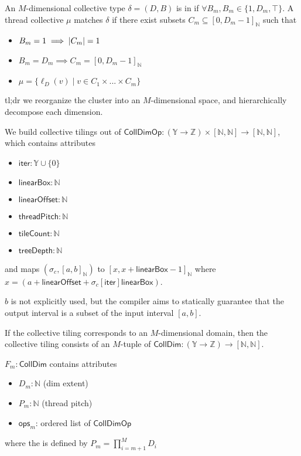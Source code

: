 \filbreak
{}

An $M$-dimensional collective type $\delta = (D, B)$ is in  if $\forall B_m, B_m \in \{1, D_m, \top\}$.
A thread collective $\mu$ matches $\delta$ if there exist subsets $C_m \subseteq [0, D_m - 1]_\mathbb{N}$ such that
\begin{itemize}
  \item $B_m = 1 \implies \left \vert C_m \right\vert = 1$
  \item $B_m = D_m \implies C_m = [0, D_m-1]_\mathbb{N}$
  \item $\mu = \{ \ell_D(v) \mid v \in C_1 \times ... \times C_m \}$
\end{itemize}

\filbreak
{}

tl;dr we reorganize the cluster into an $M$-dimensional space, and hierarchically decompose each dimension.

We build collective tilings out of $\mathsf{CollDimOp}: (\mathbb{Y} \to \mathbb{Z}) \times [\mathbb{N}, \mathbb{N}] \to [\mathbb{N}, \mathbb{N}]$, which contains attributes
\begin{itemize}
  \item $\mathsf{iter}: \mathbb{Y} \cup \{0\}$
  \filbreak
  \item $\mathsf{linearBox}: \mathbb{N}$
  \filbreak
  \item $\mathsf{linearOffset}: \mathbb{N}$
  \filbreak
  \item $\mathsf{threadPitch}: \mathbb{N}$
  \filbreak
  \item $\mathsf{tileCount}: \mathbb{N}$
  \filbreak
  \item $\mathsf{treeDepth}: \mathbb{N}$
\end{itemize}
and maps $(\sigma_c, [a, b]_\mathbb{N})$ to $[x, x + \mathsf{linearBox} - 1]_\mathbb{N}$ where $x = (a + \mathsf{linearOffset} + \sigma_c[\mathsf{iter}] \mathsf{linearBox})$.

\filbreak
$b$ is not explicitly used, but the compiler aims to statically guarantee that the output interval is a subset of the input interval $[a, b]$.

\filbreak
If the collective tiling corresponds to an $M$-dimensional domain, then the collective tiling consists of an $M$-tuple of $\mathsf{CollDim}: (\mathbb{Y} \to \mathbb{Z}) \to [\mathbb{N}, \mathbb{N}]$.

\filbreak
$F_m: \mathsf{CollDim}$ contains attributes
\begin{itemize}
  \item $D_m: \mathbb{N}$ (dim extent)
  \filbreak
  \item $P_m: \mathbb{N}$ (thread pitch)
  \filbreak
  \item $\mathsf{ops}_m$: ordered list of $\mathsf{CollDimOp}$
\end{itemize}
where the  is defined by $P_m = \prod_{i = m+1}^M D_i$

